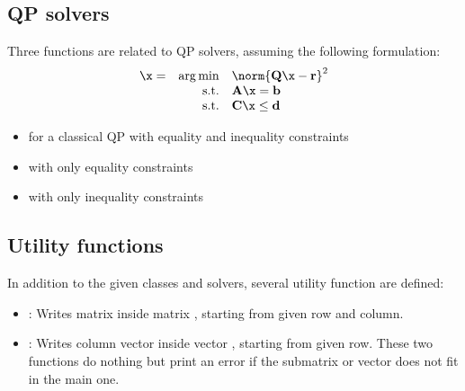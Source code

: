 \documentclass{ecnreport}
\begin{document}
% 

\subsection{QP solvers}\label{qpsolvers}

Three functions are related to QP solvers, assuming the following formulation:
\begin{equation}
 \begin{array}{lrl}
  \x = & \arg \min & \norm{\mathbf{Q}\x - \mathbf{r}}^2 \\ 
  & \text{s.t.} & \mathbf A\x =  \mathbf b \\ 
  & \text{s.t.} & \mathbf C\x \leq  \mathbf d
 \end{array}
\end{equation}

\begin{itemize}
 \item {} for a classical QP with equality and inequality constraints
 \item  {} with only equality constraints
 \item  {} with only inequality constraints
\end{itemize}


\subsection{Utility functions}

In addition to the given classes and solvers, several utility function are defined:
\begin{itemize}
 \item {}: Writes matrix  inside matrix , starting from given row and column.
 \item {}: Writes column vector  inside vector , starting from given row. These two functions do nothing but print an error
 if the submatrix or vector does not fit in the main one.
\end{itemize}
\end{document}
